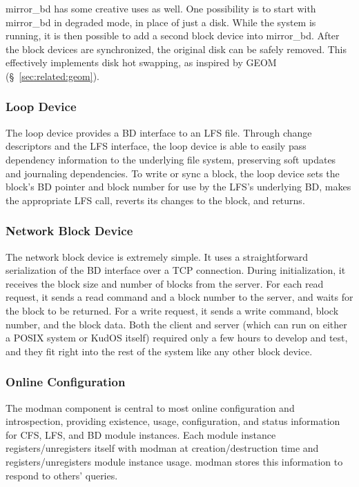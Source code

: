 mirror\_bd has some creative uses as well. One possibility is to start with
mirror\_bd in degraded mode, in place of just a disk. While the system is
running, it is then possible to add a second block device into mirror\_bd.
After the block devices are synchronized, the original disk can be safely
removed. This effectively implements disk hot swapping, as inspired by GEOM
(\S~\ref{sec:related:geom}).

\subsubsection{Loop Device}
\label{sec:solution:impl:loop}

The loop device provides a BD interface to an LFS file. Through change
descriptors and the LFS interface, the loop device is able to easily pass
dependency information to the underlying file system, preserving soft updates
and journaling dependencies. To write or sync a block, the loop device sets the
block's BD pointer and block number for use by the LFS's underlying BD, makes
the appropriate LFS call, reverts its changes to the block, and returns.

\subsubsection{Network Block Device}
\label{sec:solution:impl:nbd}

The network block device is extremely simple. It uses a straightforward
serialization of the BD interface over a TCP connection. During initialization,
it receives the block size and number of blocks from the server. For each read
request, it sends a read command and a block number to the server, and waits for
the block to be returned. For a write request, it sends a write command, block
number, and the block data. Both the client and server (which can run on either
a POSIX system or KudOS itself) required only a few hours to develop and test,
and they fit right into the rest of the system like any other block device.

\subsubsection{Online Configuration}
\label{sec:solution:impl:online}

The modman component is central to most online configuration and introspection,
providing existence, usage, configuration, and status information for CFS, LFS,
and BD module instances. Each module instance registers/unregisters itself with
modman at creation/destruction time and registers/unregisters module instance
usage. modman stores this information to respond to others' queries.

